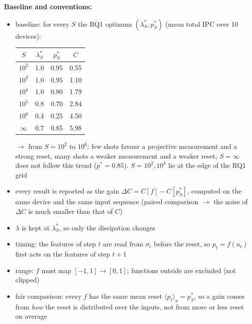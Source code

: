 \textbf{Baseline and conventions:}
\begin{itemize}
    \item baseline: for every $S$ the RQ1 optimum $(\lambda^*_S, p^*_S)$ (mean total IPC over 10 devices):
    \begin{center}
    \begin{tabular}{cccc}
        \hline
        $S$ & $\lambda^*_S$ & $p^*_S$ & $C$ \\
        \hline
        $10^2$ & 1.0 & 0.95 & 0.55 \\
        $10^3$ & 1.0 & 0.95 & 1.10 \\
        $10^4$ & 1.0 & 0.80 & 1.79 \\
        $10^5$ & 0.8 & 0.70 & 2.84 \\
        $10^6$ & 0.4 & 0.25 & 4.50 \\
        $\infty$ & 0.7 & 0.85 & 5.98 \\
        \hline
    \end{tabular}
    \end{center}
    $\to$ from $S = 10^2$ to $10^6$: few shots favour a projective measurement and a strong reset, many shots a
    weaker measurement and a weaker reset; $S = \infty$ does not follow this trend ($p^* = 0.85$).
    $S = 10^2, 10^3$ lie at the edge of the RQ1 grid
    \item every result is reported as the gain $\Delta C = C[f] - C[p^*_S]$, computed on the same device and the
    same input sequence (paired comparison $\to$ the noise of $\Delta C$ is much smaller than that of $C$)
    \item $\lambda$ is kept at $\lambda^*_S$, so only the dissipation changes
    \item timing: the features of step $t$ are read from $\sigma_t$ before the reset, so $p_t = f(u_t)$ first acts
    on the features of step $t+1$
    \item range: $f$ must map $[-1, 1] \to [0, 1]$; functions outside are excluded (not clipped)
    \item fair comparison: every $f$ has the same mean reset $\langle p_t \rangle_u = p^*_S$, so a gain comes from
    \emph{how} the reset is distributed over the inputs, not from more or less reset on average
\end{itemize}

